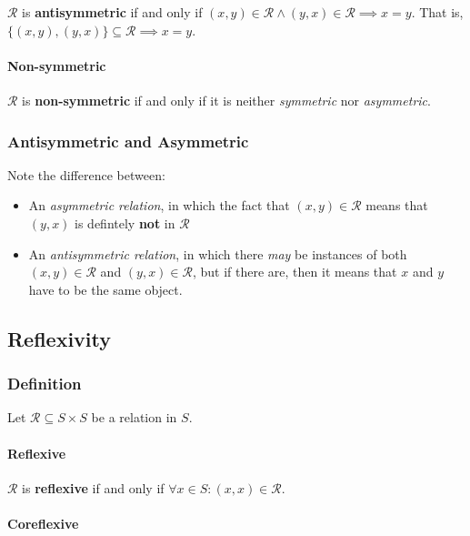 $\mathcal{R}$ is \textbf{antisymmetric} if and only if
$ (x,y) \in \mathcal{R} \land (y, x) \in \mathcal{R} \implies x = y $.
That is, $\{(x, y), (y, x) \} \subseteq \mathcal{R} \implies x = y $.

\paragraph{Non-symmetric}

$\mathcal{R}$ is \textbf{non-symmetric} if and only if it is neither
\textit{symmetric} nor \textit{asymmetric}.

\subsubsection{Antisymmetric and Asymmetric}

Note the difference between:
\begin{itemize}
\item An \textit{asymmetric relation}, in which the fact that
  $(x, y) \in \mathcal{R}$ means that $(y, x)$ is defintely
  \textbf{not} in $\mathcal{R}$
\item An \textit{antisymmetric relation}, in which there \textit{may}
  be instances of both $(x, y) \in \mathcal{R}$ and
  $(y, x) \in \mathcal{R}$, but if there are, then it means that $x$
  and $y$ have to be the same object.
\end{itemize}


\subsection{Reflexivity}
\label{sec:reflexivity}

\subsubsection{Definition}

Let $\mathcal{R} \subseteq S \times S$ be a relation in $S$.

\paragraph{Reflexive}

$\mathcal{R}$ is \textbf{reflexive} if and only if
$ \forall x \in S : (x, x) \in \mathcal{R} $.

\paragraph{Coreflexive}

